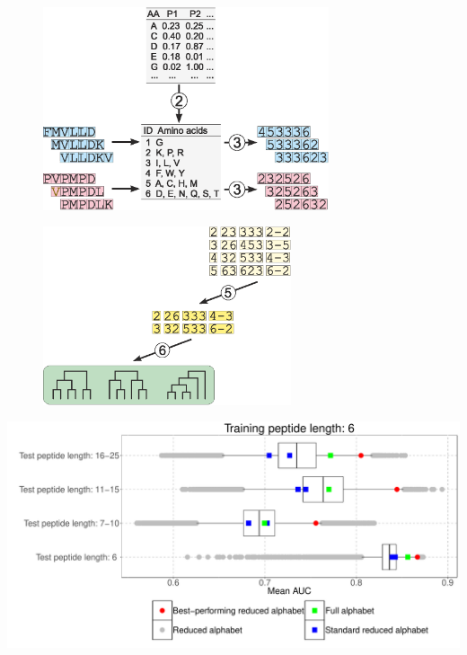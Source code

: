 \documentclass{beamer}\usepackage[]{graphicx}\usepackage[]{color}
\makeatletter
\def\maxwidth{ %
  \ifdim\Gin@nat@width>\linewidth
    \linewidth
  \else
    \Gin@nat@width
  \fi
}
\newenvironment{knitrout}{}{} %
\makeatother
\begin{document}
  
      \begin{frame}{}
\begin{figure} 
\includegraphics[width=0.75\textwidth]{static_figure/scheme2.eps}
\end{figure}

  \end{frame}
  
      \begin{frame}{}
\begin{figure} 
\includegraphics[width=0.65\textwidth]{static_figure/scheme3.eps}
\end{figure}

  \end{frame}

  
    \begin{frame}{}
\begin{knitrout}
\color{fgcolor}

{\centering \includegraphics[width=\maxwidth]{figure/unnamed-chunk-1-1} 

}



\end{knitrout}
  
  
  \end{frame}
  
\end{document}
